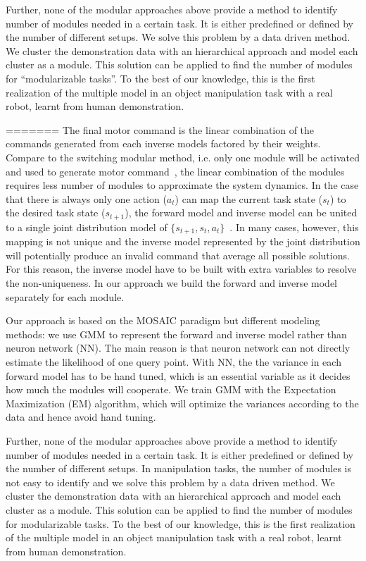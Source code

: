 Further, none of the modular approaches above provide a method to identify number of modules needed in a certain task. It is either predefined or defined by the number of different setups. We solve this problem by a data driven method. We cluster the demonstration data with an hierarchical approach and model each cluster as a module. This solution can be applied to find the number of modules for ``modularizable tasks''. To the best of our knowledge, this is the first realization of the multiple model in an object manipulation task with a real robot, learnt from human demonstration.


=======
The final motor command is the linear combination of the commands generated from each inverse models factored by their weights. Compare to the switching modular method, i.e. only one module will be activated and used to generate motor command~\cite{narendra1997adaptive}, the linear combination of the modules requires less number of modules to approximate the system dynamics. In the case that there is always only one action ($a_t$) can map the current task state ($s_t$) to the desired task state ($s_{t+1}$), the forward model and inverse model can be united to a single joint distribution model of $\{s_{t+1}, s_t, a_t\}$~\cite{petkos2006learning}. In many cases, however, this mapping is not unique and the inverse model represented by the joint distribution will potentially produce an invalid command that average all possible solutions. For this reason, the inverse model have to be built with extra variables to resolve the non-uniqueness. In our approach we build the forward and inverse model separately for each module.

Our approach is based on the MOSAIC paradigm but different modeling methods: we use GMM to represent the forward and inverse model rather than neuron network (NN). The main reason is that neuron network can not directly estimate the likelihood of one query point. With NN, the the variance in each forward model has to be hand tuned, which is an essential variable as it decides how much the modules will cooperate. We train GMM with the Expectation Maximization (EM) algorithm, which will optimize the variances according to the data and hence avoid hand tuning.

Further, none of the modular approaches above provide a method to identify number of modules needed in a certain task. It is either predefined or defined by the number of different setups. In manipulation tasks, the number of modules is not easy to identify and we solve this problem by a data driven method. We cluster the demonstration data with an hierarchical approach and model each cluster as a module. This solution can be applied to find the number of modules for modularizable tasks. To the best of our knowledge, this is the first realization of the multiple model in an object manipulation task with a real robot, learnt from human demonstration.

